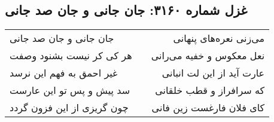 \begin{center}
\section*{غزل شماره ۳۱۶۰: جان جانی و جان صد جانی}
\label{sec:3160}
\begin{longtable}{l p{0.5cm} r}
جان جانی و جان صد جانی
&&
می‌زنی نعره‌های پنهانی
\\
هر کی کر نیست بشنود وصفت
&&
نعل معکوس و خفیه می‌رانی
\\
غیر احمق به فهم این نرسد
&&
عارت آید از این لت انبانی
\\
سد پیش و پس تو این عارست
&&
که سرافراز و قطب خلقانی
\\
چون گریزی از این فزون گردد
&&
کای فلان فارغست زین فانی
\\
\end{longtable}
\end{center}
